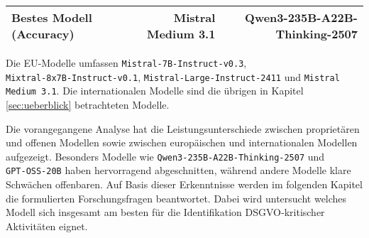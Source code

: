\begin{table}[htbp]
\begin{adjustbox}{width=\textwidth}
\begin{threeparttable}[width=\textwidth]
\begin{tabular}[width=\textwidth]{l r r}
    Bestes Modell (Accuracy)    & Mistral Medium 3.1          & Qwen3-235B-A22B-Thinking-2507 \\
    \bottomrule
   \end{tabular}
   \begin{tablenotes}
    \footnotesize
    \item Die \ac{EU}‑Modelle umfassen \texttt{Mistral‑7B‑Instruct‑v0.3}, \texttt{Mixtral‑8x7B‑Instruct‑v0.1}, \texttt{Mistral‑Large‑Instruct‑2411} und \texttt{Mistral Medium 3.1}. Die internationalen Modelle sind die übrigen in Kapitel \ref{sec:ueberblick} betrachteten Modelle.
   \end{tablenotes}
  \end{threeparttable}
 \end{adjustbox}
\end{table}

 Die vorangegangene Analyse hat die Leistungsunterschiede zwischen proprietären und offenen Modellen sowie zwischen europäischen und internationalen Modellen aufgezeigt. Besonders Modelle wie \texttt{Qwen3‑235B‑A22B‑Thinking‑2507} und \texttt{GPT‑OSS‑20B} haben hervorragend abgeschnitten, während andere Modelle klare Schwächen offenbaren. Auf Basis dieser Erkenntnisse werden im folgenden Kapitel die formulierten Forschungsfragen beantwortet. Dabei wird untersucht welches Modell sich insgesamt am besten für die Identifikation \ac{DSGVO}‑kritischer Aktivitäten eignet.
